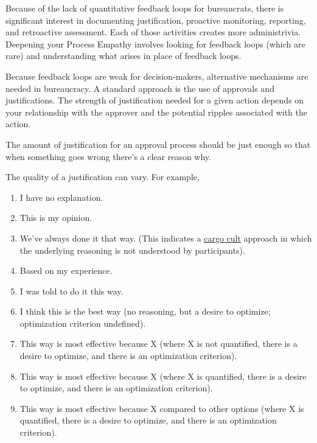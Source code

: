 Because of the lack of quantitative feedback loops for bureaucrats, there is significant interest in documenting justification, proactive monitoring, reporting, and retroactive assessment. Each of those activities creates more administrivia. Deepening your Process Empathy involves looking for feedback loops (which are rare) and understanding what arises in place of feedback loops.


Because feedback loops are weak for decision-makers, alternative mechanisms are needed in bureaucracy. A standard approach is the use of approvals and justifications. The strength of justification needed for a given action depends on your relationship with the approver and the potential ripples associated with the action. 

The amount of justification for an approval process should be just enough so that when something goes wrong there's a clear reason why. 

The quality of a justification can vary. For example,
\begin{enumerate}
    \item I have no explanation.
    \item This is my opinion.
    \item We've always done it that way. (This indicates a \href{https://en.wikipedia.org/wiki/Cargo_cult}{cargo cult} approach in which the underlying reasoning is not understood by participants).
    \iftoggle{WPinmargin}{\marginpar{$>$Wikipedia: Cargo cult}}{ }%
    \item Based on my experience.
    \item I was told to do it this way.
    \item I think this is the best way (no reasoning, but a desire to optimize; optimization criterion undefined).
    \item This way is most effective because X (where X is not quantified, there is a desire to optimize, and there is an optimization criterion).
    \item This way is most effective because X (where X is quantified, there is a desire to optimize, and there is an optimization criterion).
    \item This way is most effective because X compared to other options (where X is quantified, there is a desire to optimize, and there is an optimization criterion).
\end{enumerate}


